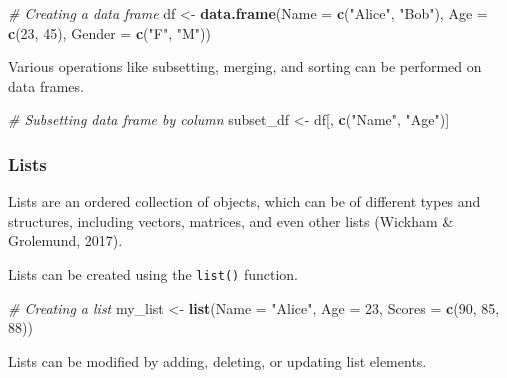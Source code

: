 \documentclass[
]{book}
\newenvironment{Shaded}{\begin{snugshade}}{\end{snugshade}}
\newcommand{\AttributeTok}[1]{\textcolor[rgb]{0.13,0.29,0.53}{#1}}
\newcommand{\CommentTok}[1]{\textcolor[rgb]{0.56,0.35,0.01}{\textit{#1}}}
\newcommand{\DecValTok}[1]{\textcolor[rgb]{0.00,0.00,0.81}{#1}}
\newcommand{\FunctionTok}[1]{\textcolor[rgb]{0.13,0.29,0.53}{\textbf{#1}}}
\newcommand{\NormalTok}[1]{#1}
\newcommand{\OtherTok}[1]{\textcolor[rgb]{0.56,0.35,0.01}{#1}}
\newcommand{\StringTok}[1]{\textcolor[rgb]{0.31,0.60,0.02}{#1}}
\begin{document}
\begin{Shaded}
\begin{Highlighting}[]
\CommentTok{\# Creating a data frame}
\NormalTok{df }\OtherTok{\textless{}{-}} \FunctionTok{data.frame}\NormalTok{(}\AttributeTok{Name =} \FunctionTok{c}\NormalTok{(}\StringTok{"Alice"}\NormalTok{, }\StringTok{"Bob"}\NormalTok{), }\AttributeTok{Age =} \FunctionTok{c}\NormalTok{(}\DecValTok{23}\NormalTok{, }\DecValTok{45}\NormalTok{), }\AttributeTok{Gender =} \FunctionTok{c}\NormalTok{(}\StringTok{"F"}\NormalTok{, }\StringTok{"M"}\NormalTok{))}
\end{Highlighting}
\end{Shaded}

Various operations like subsetting, merging, and sorting can be performed on data frames.

\begin{Shaded}
\begin{Highlighting}[]
\CommentTok{\# Subsetting data frame by column}
\NormalTok{subset\_df }\OtherTok{\textless{}{-}}\NormalTok{ df[, }\FunctionTok{c}\NormalTok{(}\StringTok{"Name"}\NormalTok{, }\StringTok{"Age"}\NormalTok{)]}
\end{Highlighting}
\end{Shaded}

\subsubsection*{Lists}\label{lists}

Lists are an ordered collection of objects, which can be of different types and structures, including vectors, matrices, and even other lists (Wickham \& Grolemund, 2017).

Lists can be created using the \texttt{list()} function.

\begin{Shaded}
\begin{Highlighting}[]
\CommentTok{\# Creating a list}
\NormalTok{my\_list }\OtherTok{\textless{}{-}} \FunctionTok{list}\NormalTok{(}\AttributeTok{Name =} \StringTok{"Alice"}\NormalTok{, }\AttributeTok{Age =} \DecValTok{23}\NormalTok{, }\AttributeTok{Scores =} \FunctionTok{c}\NormalTok{(}\DecValTok{90}\NormalTok{, }\DecValTok{85}\NormalTok{, }\DecValTok{88}\NormalTok{))}
\end{Highlighting}
\end{Shaded}

Lists can be modified by adding, deleting, or updating list elements.
\end{document}
